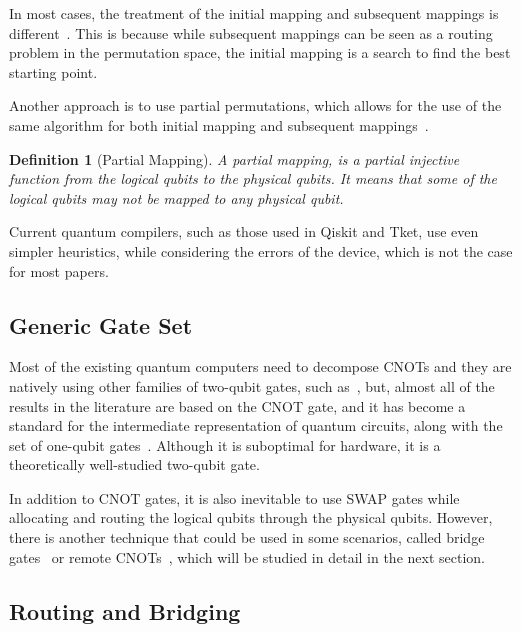 \documentclass{report}
\newtheorem{definition}{Definition}
\begin{document}
In most cases, the treatment of the initial mapping and subsequent mappings is different~\cite{zhou2020, li2019}. This is because while subsequent mappings can be seen as a routing problem in the permutation space, the initial mapping is a search to find the best starting point.

Another approach is to use partial permutations, which allows for the use of the same algorithm for both initial mapping and subsequent mappings~\cite{childs, zulehner2018}.

\begin{definition}[Partial Mapping]
  A partial mapping, is a partial injective function from the logical qubits to the physical qubits.
  It means that some of the logical qubits may not be mapped to any physical qubit.
\end{definition}

Current quantum compilers, such as those used in Qiskit\cite{qiskit2023, cross2022, murali2019} and Tket\cite{sivarajah2021}, use even simpler heuristics, while considering the errors of the device, which is not the case for most papers.

\subsection{Generic Gate Set}

Most of the existing quantum computers need to decompose CNOTs and they are natively using other families of two-qubit gates, such as~\cite{foxen2020}, but, almost all of the results in the literature are based on the CNOT gate, and it has become a standard for the intermediate representation of quantum circuits, along with the set of one-qubit gates~\cite{zulehner2018,siraichi2018,li2019,zhang2021,zhou2020,itoko2019,murali2019,sivarajah2021}. Although it is suboptimal for hardware, it is a theoretically well-studied two-qubit gate.

In addition to CNOT gates, it is also inevitable to use SWAP gates while allocating and routing the logical qubits through the physical qubits. However, there is another technique that could be used in some scenarios, called bridge gates~\cite{sivarajah2021,itoko2019,shende2006,siraichi2018} or remote CNOTs~\cite{zhou2020, nash2020}, which will be studied in detail in the next section.

\subsection{Routing and Bridging}
\end{document}
